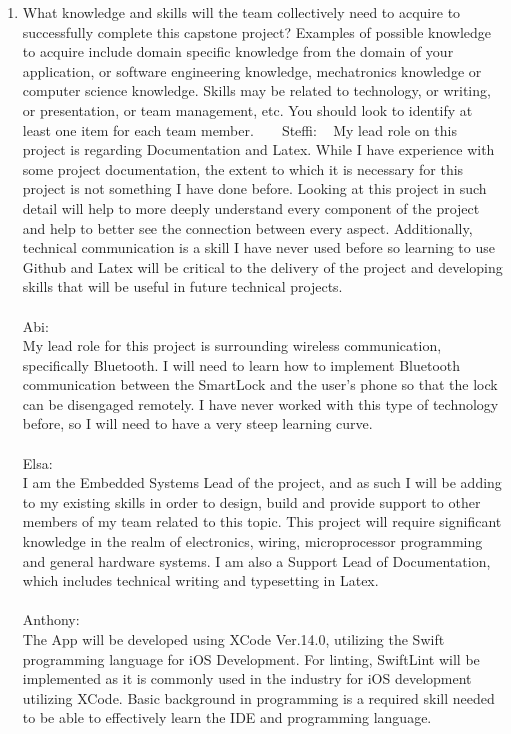 \documentclass[12pt]{article}
\begin{document}
\begin{enumerate}
  \item What knowledge and skills will the team collectively need to acquire to successfully complete this capstone project?  Examples of possible knowledge to acquire include domain specific knowledge from the domain of your application, or software engineering knowledge, mechatronics knowledge or
  computer science knowledge.  Skills may be related to technology, or writing, or presentation, or team management, etc.  You should look to identify at least one item for each team member.
  ~\newline
  ~\newline
 Steffi: 
  ~\newline
My lead role on this project is regarding Documentation and Latex.  While I have experience with some project documentation, the extent to which it is necessary for this project is not something I have done before.  Looking at this project in such detail will help to more deeply understand every component of the project and help to better see the connection between every aspect.  Additionally, technical communication is a skill I have never used before so learning to use Github and Latex will be critical to the delivery of the project and developing skills that will be useful in future technical projects.
\\
\\
Abi:
\\
My lead role for this project is surrounding wireless communication, specifically Bluetooth.  I will need to learn how to implement Bluetooth communication between the SmartLock and the user's phone so that the lock can be disengaged remotely.  I have never worked with this type of technology before, so I will need to have a very steep learning curve. 
 \\
\\
Elsa:
\\ 
 I am the Embedded Systems Lead of the project, and as such I will be adding to my existing skills in order to design, build and provide support to other members of my team related to this topic. This project will require significant knowledge in the realm of electronics, wiring, microprocessor programming and general hardware systems. I am also a Support Lead of Documentation, which includes technical writing and typesetting in Latex. 
 \\
 \\
 Anthony: 
 \\
 The App will be developed using XCode Ver.14.0, utilizing the Swift programming language for iOS Development. For linting, SwiftLint will be implemented as it is commonly used in the industry for iOS development utilizing XCode. Basic background in programming is a required skill needed to be able to effectively learn the IDE and programming language.

\end{enumerate}
\end{document}
